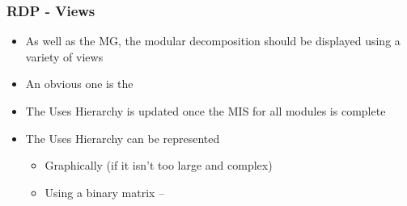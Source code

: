\documentclass[t,12pt,numbers,fleqn]{beamer}
\begin{document}

\begin{frame}
\frametitle{RDP - Views}

\begin{itemize}
\item As well as the MG, the modular decomposition should be displayed using a
  variety of views
\item An obvious one is the 
\item The Uses Hierarchy is updated once the MIS for all modules is complete
\item The Uses Hierarchy can be represented 
\begin{itemize} 
\item Graphically (if it isn't too large and complex)
\item Using a binary matrix -- 
\end{itemize}
\end{itemize}

\end{frame}







\end{document}
